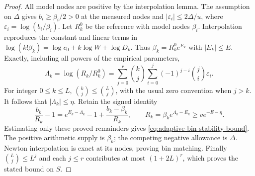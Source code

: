\documentclass[11pt]{article}
\theoremstyle{definition}
\begin{document}
\begin{proof}
All model nodes are positive by the interpolation lemma.
The assumption on $\Delta$ gives $b_i\ge\beta_i/2>0$
at the measured nodes and
$|\varepsilon_i|\le2\Delta/u$, where
$\varepsilon_i=\log(b_i/\beta_i)$.
Let $R_k^0$ be the reference with model nodes $\beta_i$.
Interpolation reproduces the constant and linear terms in
$\log(k!\beta_k)=\log c_0+k\log W+\log D_k$.
Thus $\beta_k=R_k^0e^{E_k}$ with $|E_k|\le E$.
Exactly, including all powers of the empirical parameters,
\[
 \Lambda_k=\log(R_k/R_k^0)
   =\sum_{j=0}^r{k\choose j}
            \sum_{i=0}^j(-1)^{j-i}{j\choose i}\varepsilon_i .
\]
For integer $0\le k\le L$,
$\binom kj\le\binom Lj$, with the usual zero convention
when $j>k$.
It follows that $|\Lambda_k|\le\eta$.
Retain the signed identity
\begin{equation}
 \frac{b_k}{R_k}-1
       =e^{E_k-\Lambda_k}-1
                         +\frac{b_k-\beta_k}{R_k},
 \qquad R_k=\beta_ke^{\Lambda_k-E_k}
                         \ge v e^{-E-\eta}.
 \label{eq:adaptive-bin-signed-consumer}
\end{equation}
Estimating only these proved remainders gives
\eqref{eq:adaptive-bin-stability-bound}.
The positive arithmetic supply is $\beta_k$; the competing
negative allowance is $\Delta$.
Newton interpolation is exact at its nodes, proving bin matching.
Finally $\binom Lj\le L^j$ and each $j\le r$ contributes
at most $(1+2L)^r$, which proves the stated bound on $S$.
\end{proof}
\end{document}
